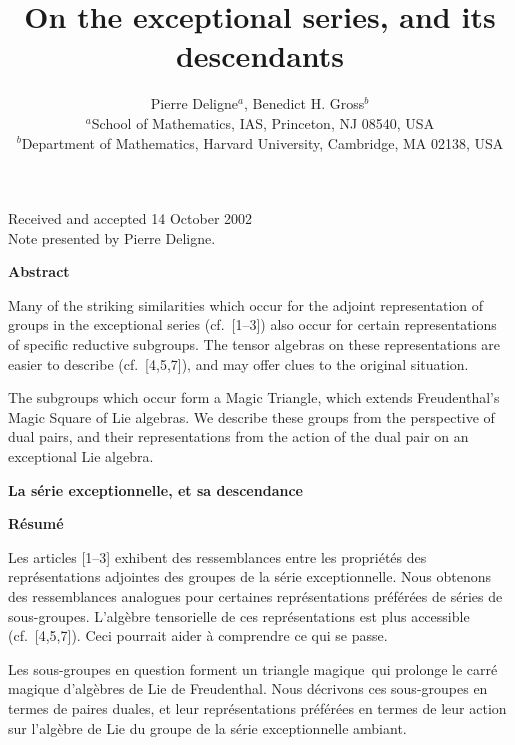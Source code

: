 \documentclass[11pt,a4paper]{article}
\title{\textbf{On the exceptional series, and its descendants}}
\author{Pierre Deligne$^{a}$, Benedict H. Gross$^{b}$\\
\small $^{a}$School of Mathematics, IAS, Princeton, NJ 08540, USA\\
\small $^{b}$Department of Mathematics, Harvard University, Cambridge, MA 02138, USA}
\date{}
\begin{document}
\maketitle

\begin{center}
\small Received and accepted 14 October 2002\\
\small Note presented by Pierre Deligne.
\end{center}

\bigskip
\noindent\textbf{Abstract}

\medskip
\noindent
Many of the striking similarities which occur for the adjoint representation of groups in the exceptional series (cf.~[1--3]) also occur for certain representations of specific reductive subgroups. The tensor algebras on these representations are easier to describe (cf.~[4,5,7]), and may offer clues to the original situation.

The subgroups which occur form a Magic Triangle, which extends Freudenthal's Magic Square of Lie algebras. We describe these groups from the perspective of dual pairs, and their representations from the action of the dual pair on an exceptional Lie algebra.

\bigskip
{}
\noindent\textbf{La s\'{e}rie exceptionnelle, et sa descendance}

\medskip
\noindent\textbf{R\'{e}sum\'{e}}

\medskip
\noindent
Les articles [1--3] exhibent des ressemblances entre les propri\'{e}t\'{e}s des repr\'{e}sentations adjointes des groupes de la s\'{e}rie exceptionnelle. Nous obtenons des ressemblances analogues pour certaines repr\'{e}sentations pr\'{e}f\'{e}r\'{e}es de s\'{e}ries de sous-groupes. L'alg\`{e}bre tensorielle de ces repr\'{e}sentations est plus accessible (cf.~[4,5,7]). Ceci pourrait aider \`{a} comprendre ce qui se passe.

Les sous-groupes en question forment un \guillemotleft triangle magique\guillemotright\ qui prolonge le carr\'{e} magique d'alg\`{e}bres de Lie de Freudenthal. Nous d\'{e}crivons ces sous-groupes en termes de paires duales, et leur repr\'{e}sentations pr\'{e}f\'{e}r\'{e}es en termes de leur action sur l'alg\`{e}bre de Lie du groupe de la s\'{e}rie exceptionnelle ambiant.
\end{document}
